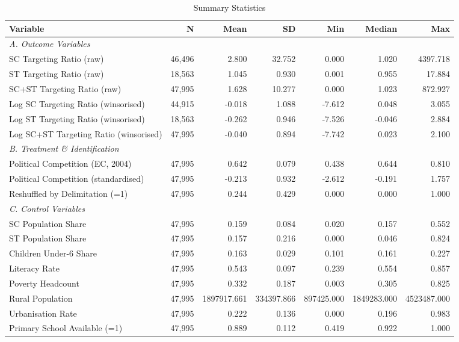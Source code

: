 \begin{table}[htbp]
\centering
\caption{Summary Statistics}
\label{tab:summary_stats}
\small
\begin{tabular}{lrrrrrr}
\hline\hline
\textbf{Variable} & \textbf{N} & \textbf{Mean} & \textbf{SD} & \textbf{Min} & \textbf{Median} & \textbf{Max} \\
\hline
\multicolumn{7}{l}{\textit{A. Outcome Variables}} \\
SC Targeting Ratio (raw) & 46,496 & 2.800 & 32.752 & 0.000 & 1.020 & 4397.718 \\
ST Targeting Ratio (raw) & 18,563 & 1.045 & 0.930 & 0.001 & 0.955 & 17.884 \\
SC+ST Targeting Ratio (raw) & 47,995 & 1.628 & 10.277 & 0.000 & 1.023 & 872.927 \\
Log SC Targeting Ratio (winsorised) & 44,915 & -0.018 & 1.088 & -7.612 & 0.048 & 3.055 \\
Log ST Targeting Ratio (winsorised) & 18,563 & -0.262 & 0.946 & -7.526 & -0.046 & 2.884 \\
Log SC+ST Targeting Ratio (winsorised) & 47,995 & -0.040 & 0.894 & -7.742 & 0.023 & 2.100 \\
\multicolumn{7}{l}{\textit{B. Treatment \& Identification}} \\
Political Competition (EC, 2004) & 47,995 & 0.642 & 0.079 & 0.438 & 0.644 & 0.810 \\
Political Competition (standardised) & 47,995 & -0.213 & 0.932 & -2.612 & -0.191 & 1.757 \\
Reshuffled by Delimitation (=1) & 47,995 & 0.244 & 0.429 & 0.000 & 0.000 & 1.000 \\
\multicolumn{7}{l}{\textit{C. Control Variables}} \\
SC Population Share & 47,995 & 0.159 & 0.084 & 0.020 & 0.157 & 0.552 \\
ST Population Share & 47,995 & 0.157 & 0.216 & 0.000 & 0.046 & 0.824 \\
Children Under-6 Share & 47,995 & 0.163 & 0.029 & 0.101 & 0.161 & 0.227 \\
Literacy Rate & 47,995 & 0.543 & 0.097 & 0.239 & 0.554 & 0.857 \\
Poverty Headcount & 47,995 & 0.332 & 0.187 & 0.003 & 0.305 & 0.825 \\
Rural Population & 47,995 & 1897917.661 & 334397.866 & 897425.000 & 1849283.000 & 4523487.000 \\
Urbanisation Rate & 47,995 & 0.222 & 0.136 & 0.000 & 0.196 & 0.983 \\
Primary School Available (=1) & 47,995 & 0.889 & 0.112 & 0.419 & 0.922 & 1.000 \\

\end{tabular}
\end{table}
